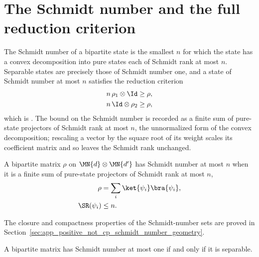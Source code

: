 \section{The Schmidt number and the full reduction criterion}

The Schmidt number of a bipartite state is the smallest $n$ for which the state has
a convex decomposition into pure states each of Schmidt rank at most $n$. Separable
states are precisely those of Schmidt number one, and a state of Schmidt number at
most $n$ satisfies the reduction criterion
\begin{align}
    n\,\rho_1\otimes\Id & \ge\rho,
    \notag                         \\
    n\,\Id\otimes\rho_2 & \ge\rho,
    \notag
\end{align}
which is \cite[Equation~(3.18)]{Wolf2012Quantum}. The bound on the Schmidt number is
recorded as a finite sum of pure-state projectors of Schmidt rank at most $n$, the
unnormalized form of the convex decomposition; rescaling a vector by the square root
of its weight scales its coefficient matrix and so leaves the Schmidt rank unchanged.

\begin{definition}
    \label{def:has_schmidt_number_le}
    \leanok
    A bipartite matrix $\rho$ on $\MN{d}\otimes\MN{d'}$ has Schmidt number at most $n$
    when it is a finite sum of pure-state projectors of Schmidt rank at most $n$,
    \begin{align}
        \rho        & =\sum_i\ket{\psi_i}\bra{\psi_i},
        \notag                                         \\
        \SR(\psi_i) & \le n.
        \notag
    \end{align}
\end{definition}

The closure and compactness properties of the Schmidt-number sets are proved
in Section~\ref{sec:app_positive_not_cp_schmidt_number_geometry}.

\begin{theorem}
    \label{thm:has_schmidt_number_le_one_iff_separable}
    \leanok
    A bipartite matrix has Schmidt number at most one if and only if it is separable.
\end{theorem}

